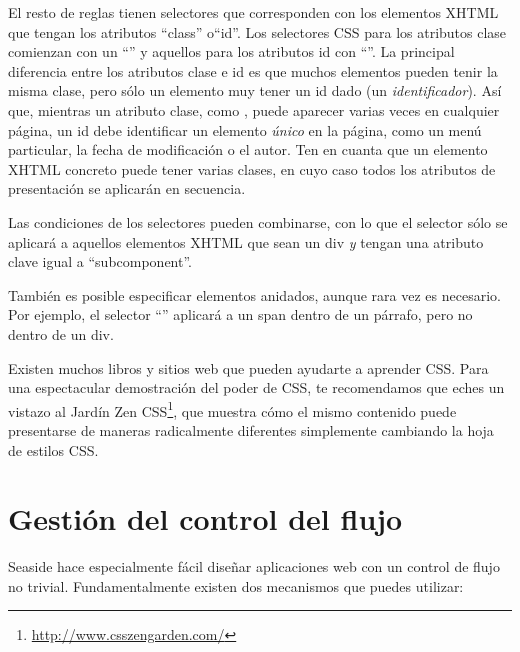 \documentclass[a4paper,10pt,twoside]{book}
\begin{document}
El resto de reglas tienen selectores que corresponden con los elementos XHTML que tengan los atributos ``class'' o``id''.
Los selectores CSS para los atributos clase comienzan con un ``'' y aquellos para los atributos id con ``\ct{#}''.
La principal diferencia entre los atributos clase e id es que muchos elementos pueden tenir la misma clase, pero sólo un elemento muy tener un id dado (\ie un \emph{identificador}). 
Así que, mientras un atributo clase, como , puede aparecer varias veces en cualquier página, un id debe identificar un elemento \emph{único} en la página, como un menú particular, la fecha de modificación o el autor.
Ten en cuanta que un elemento XHTML concreto puede tener varias clases, en cuyo caso todos los atributos de presentación se aplicarán en secuencia.


Las condiciones de los selectores pueden combinarse, con lo que el selector  sólo se aplicará a aquellos elementos XHTML que sean un div \emph{y} tengan una atributo clave igual a ``subcomponent''.

También es posible especificar elementos anidados, aunque rara vez es necesario.
Por ejemplo, el selector ``'' aplicará a un span dentro de un párrafo, pero no dentro de un div.

Existen muchos libros y sitios web que pueden ayudarte a aprender CSS.
Para una espectacular demostración del poder de CSS, te recomendamos que eches un vistazo al Jardín Zen CSS\footnote{\url{http://www.csszengarden.com/}}, que muestra cómo el mismo contenido puede presentarse de maneras radicalmente diferentes simplemente cambiando la hoja de estilos CSS.

\section{Gestión del control del flujo}

Seaside hace especialmente fácil diseñar aplicaciones web con un control de flujo no trivial.
Fundamentalmente existen dos mecanismos que puedes utilizar:
\end{document}
